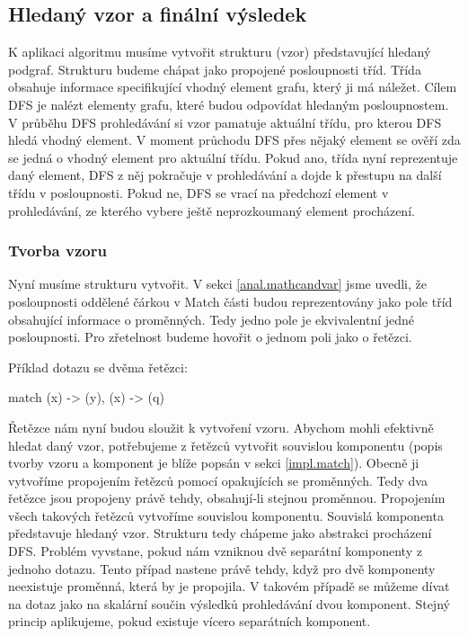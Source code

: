 \subsection{Hledaný vzor a finální výsledek} \label{anal.match.res}

K aplikaci algoritmu musíme vytvořit strukturu (vzor) představující hledaný podgraf.
Strukturu budeme chápat jako propojené posloupnosti tříd.
Třída obsahuje informace specifikující vhodný element grafu, který ji má náležet.
Cílem DFS je nalézt elementy grafu, které budou odpovídat hledaným posloupnostem.
V průběhu DFS prohledávání si vzor pamatuje aktuální třídu, pro kterou DFS hledá vhodný element.
V moment průchodu DFS přes nějaký element se ověří zda se jedná o vhodný element pro aktuální třídu.
Pokud ano, třída nyní reprezentuje daný element, DFS z něj pokračuje v prohledávání a dojde k přestupu na další třídu v posloupnosti.
Pokud ne, DFS se vrací na předchozí element v prohledávání, ze kterého vybere ještě neprozkoumaný element procházení.

\subsubsection{Tvorba vzoru}

Nyní musíme strukturu vytvořit.
V sekci \ref{anal.mathcandvar} jsme uvedli, že posloupnosti oddělené čárkou v Match části budou reprezentovány jako pole tříd obsahující informace o proměnných.
Tedy jedno pole je ekvivalentní jedné posloupnosti.
Pro zřetelnost budeme hovořit o jednom poli jako o řetězci.

Příklad dotazu se dvěma řetězci:
\begin{code}
match (x) -> (y), (x) -> (q)
\end{code}

Řetězce nám nyní budou sloužit k vytvoření vzoru.
Abychom mohli efektivně hledat daný vzor, potřebujeme z řetězců vytvořit souvislou komponentu
(popis tvorby vzoru a komponent je blíže popsán v sekci \ref{impl.match}). 
Obecně ji vytvoříme propojením řetězců pomocí opakujících se proměnných.
Tedy dva řetězce jsou propojeny právě tehdy, obsahují-li stejnou proměnnou. 
Propojením všech takových řetězců vytvoříme souvislou komponentu.
Souvislá komponenta představuje hledaný vzor.
Strukturu tedy chápeme jako abstrakci procházení DFS.
Problém vyvstane, pokud nám vzniknou dvě separátní komponenty z jednoho dotazu.
Tento případ nastene právě tehdy, když pro dvě komponenty neexistuje proměnná, která by je propojila.
V takovém případě se můžeme dívat na dotaz jako na skalární součin výsledků prohledávání dvou komponent.
Stejný princip aplikujeme, pokud existuje vícero separátních komponent.

